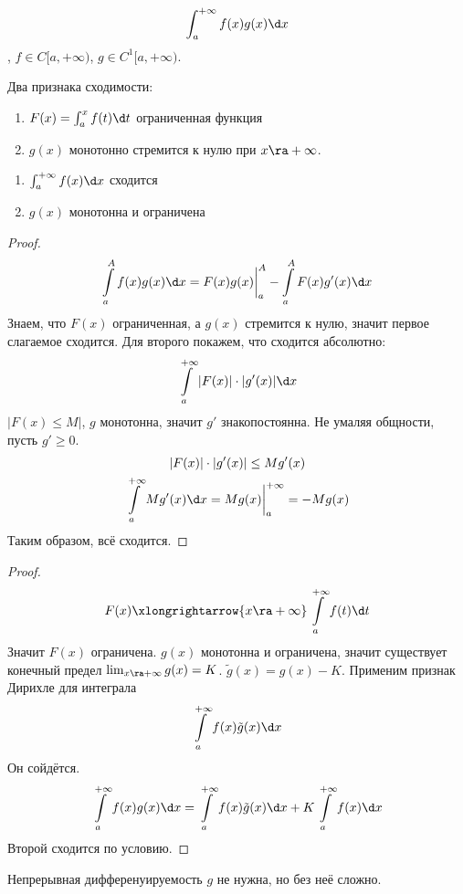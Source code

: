 \[ \int_a^{+\infty} f(x) g(x) \d x \], $f \in C[a, +\infty)$, $g \in C^1[a, +\infty)$.

Два признака сходимости:
\begin{theorem}
	\begin{enumerate}
		\item $F(x) = \int_a^x f(t) \d t$ ограниченная функция
		\item $g(x)$ монотонно стремится к нулю при $x \ra +\infty$.
	\end{enumerate}
\end{theorem}

\begin{theorem}
	\begin{enumerate}
		\item $\int_a^{+\infty} f(x) \d x$ сходится
		\item $g(x)$ монотонна и ограничена
	\end{enumerate}
\end{theorem}

\begin{proof}
	\[ \int\limits_a^A f(x) g(x) \d x = F(x) g(x) \biggr|_a^A - \int\limits_a^A F(x) g'(x) \d x \]
	Знаем, что $F(x)$ ограниченная, а $g(x)$ стремится к нулю, значит первое слагаемое сходится.
	Для второго покажем, что сходится абсолютно:
	\[ \int\limits_a^{+\infty} |F(x)|\cdot|g'(x)| \d x \]
	$|F(x) \le M|$, $g$ монотонна, значит $g'$ знакопостоянна.
	Не умаляя общности, пусть $g' \ge 0$.
	\begin{gather*}
		|F(x)| \cdot |g'(x)| \le Mg'(x) \\
		\int\limits_a^{+\infty} Mg'(x) \d x = Mg(x) \biggr|_a^{+\infty} = -Mg(x)
	\end{gather*}
	Таким образом, всё сходится.
\end{proof}

\begin{proof}
	\[ F(x) \xlongrightarrow{x \ra +\infty} \int\limits_a^{+\infty} f(t) \d t\]
	Значит $F(x)$ ограничена.
	$g(x)$ монотонна и ограничена, значит существует конечный предел $\lim_{x\ra+\infty} g(x) = K$.
	$\tilde g(x) = g(x) - K$.
	Применим признак Дирихле для интеграла
	\[ \int\limits_a^{+\infty} f(x) \tilde g(x) \d x \]
	Он сойдётся.
	\[ \int\limits_a^{+\infty} f(x) g(x) \d x = \int\limits_a^{+\infty} f(x) \tilde g(x) \d x + K \int\limits_a^{+\infty} f(x) \d x \]
	Второй сходится по условию.
\end{proof}

\begin{Rem}
	Непрерывная дифференуируемость $g$ не нужна, но без неё сложно.
\end{Rem}

